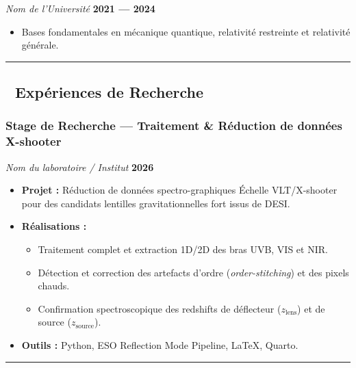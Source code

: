 \documentclass[
]{article}
\providecommand{\tightlist}{%
  \setlength{\itemsep}{0pt}\setlength{\parskip}{0pt}}
\begin{document}
\emph{Nom de l'Université} \textbar{} \textbf{2021 --- 2024}

\begin{itemize}
\tightlist
\item
  Bases fondamentales en mécanique quantique, relativité restreinte et
  relativité générale.
\end{itemize}

\begin{center}\rule{0.5\linewidth}{0.5pt}\end{center}

\subsection{🔬 Expériences de
Recherche}\label{expuxe9riences-de-recherche}

\subsubsection{Stage de Recherche --- Traitement \& Réduction de données
X-shooter}\label{stage-de-recherche-traitement-ruxe9duction-de-donnuxe9es-x-shooter}

\emph{Nom du laboratoire / Institut} \textbar{} \textbf{2026}

\begin{itemize}
\tightlist
\item
  \textbf{Projet :} Réduction de données spectro-graphiques Échelle
  VLT/X-shooter pour des candidats lentilles gravitationnelles fort
  issus de DESI.
\item
  \textbf{Réalisations :}

  \begin{itemize}
  \tightlist
  \item
    Traitement complet et extraction 1D/2D des bras UVB, VIS et NIR.
  \item
    Détection et correction des artefacts d'ordre
    (\emph{order-stitching}) et des pixels chauds.
  \item
    Confirmation spectroscopique des redshifts de déflecteur
    (\(z_{\text{lens}}\)) et de source (\(z_{\text{source}}\)).
  \end{itemize}
\item
  \textbf{Outils :} Python, ESO Reflection Mode Pipeline, LaTeX, Quarto.
\end{itemize}

\begin{center}\rule{0.5\linewidth}{0.5pt}\end{center}
\end{document}
